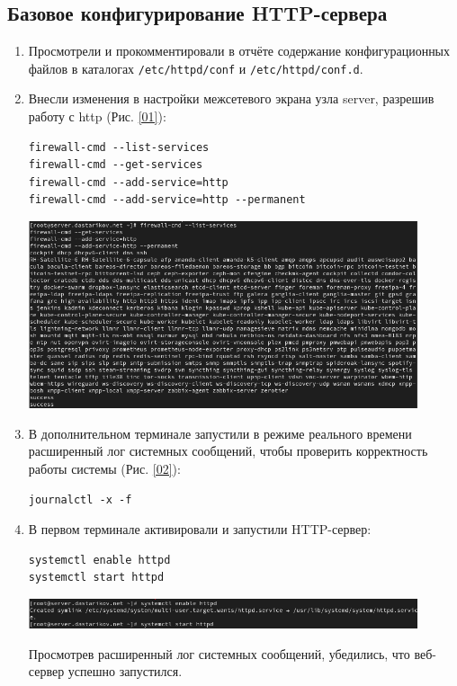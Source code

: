 \subsection{Базовое конфигурирование HTTP-сервера}
\begin{enumerate}
\item Просмотрели и прокомментировали в отчёте содержание конфигурационных файлов в каталогах {\tt /etc/httpd/conf} и {\tt /etc/httpd/conf.d}.
\item Внесли изменения в настройки межсетевого экрана узла server, разрешив работу с http (Рис. \ref{01}):
\begin{verbatim}
firewall-cmd --list-services
firewall-cmd --get-services
firewall-cmd --add-service=http
firewall-cmd --add-service=http --permanent
\end{verbatim}

\begin{center}
    \centering
    \includegraphics[width=0.9\textwidth]{../images/image01.png}
    \label{01}
\end{center}

\item В дополнительном терминале запустили в режиме реального времени расширенный лог системных сообщений, чтобы проверить корректность работы системы (Рис. \ref{02}):

\begin{verbatim}
journalctl -x -f
\end{verbatim}
\item В первом терминале активировали и запустили HTTP-сервер:
\begin{verbatim}
systemctl enable httpd
systemctl start httpd
\end{verbatim}

\begin{center}
    \centering
    \includegraphics[width=0.9\textwidth]{../images/image02.png}
    \label{02}
\end{center}

Просмотрев расширенный лог системных сообщений, убедились, что веб-сервер успешно запустился.
\end{enumerate}

